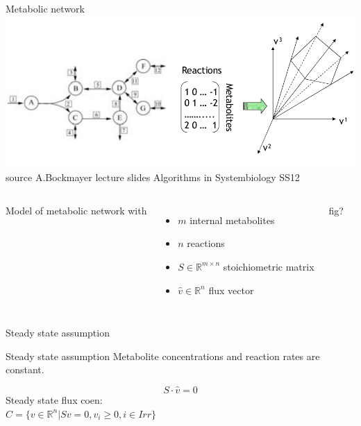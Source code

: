 \documentclass{beamer}
\begin{document}
\begin{frame}{Metabolic network}
    \includegraphics[width=\textwidth]{grafik/modelling} \\
    \footnotesize{
        source A.Bockmayer lecture slides Algorithms in Systembiology SS12
        }
    \begin{columns}
        Model of metabolic network with
        \begin{itemize}
            \item $m$ internal metabolites
            \item $n$ reactions
            \item $S \in \mathbb{R}^{m\times n}$ stoichiometric matrix
            \item $\hat{v} \in \mathbb{R}^{n}$ flux vector
        \end{itemize}
        fig?
    \end{columns}
\end{frame}

\begin{frame}{Steady state assumption}    
    \begin{block}{Steady state assumption}
        Metabolite concentrations and reaction rates are constant.
    \end{block}
    \begin{equation}
    S \cdot \hat{v} = 0 
    \end{equation}
    Steady state flux coen: \\
    $C = \{v \in \mathbb{R}^n | Sv = 0, v_i \geq 0, i \in Irr \}$
\end{frame}
\end{document}
